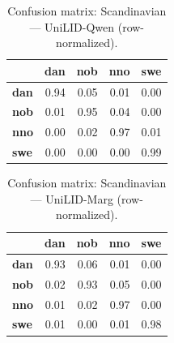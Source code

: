 \begin{table}[htbp]
\centering
\small
\begin{tabular}{lrrrr}
\toprule
 & \textbf{dan} & \textbf{nob} & \textbf{nno} & \textbf{swe} \\
\midrule
\textbf{dan} & \cellcolor{blue!94}\color{white}0.94 & \cellcolor{blue!4}0.05 & \cellcolor{blue!0}0.01 & \cellcolor{blue!0}0.00 \\
\textbf{nob} & \cellcolor{blue!0}0.01 & \cellcolor{blue!95}\color{white}0.95 & \cellcolor{blue!4}0.04 & \cellcolor{blue!0}0.00 \\
\textbf{nno} & \cellcolor{blue!0}0.00 & \cellcolor{blue!1}0.02 & \cellcolor{blue!97}\color{white}0.97 & \cellcolor{blue!0}0.01 \\
\textbf{swe} & \cellcolor{blue!0}0.00 & \cellcolor{blue!0}0.00 & \cellcolor{blue!0}0.00 & \cellcolor{blue!98}\color{white}0.99 \\
\bottomrule
\end{tabular}
\caption{Confusion matrix: Scandinavian — UniLID-Qwen (row-normalized).}
\label{tab:cm-scandinavian-unilid-qwen}
\end{table}

\begin{table}[htbp]
\centering
\small
\begin{tabular}{lrrrr}
\toprule
 & \textbf{dan} & \textbf{nob} & \textbf{nno} & \textbf{swe} \\
\midrule
\textbf{dan} & \cellcolor{blue!92}\color{white}0.93 & \cellcolor{blue!5}0.06 & \cellcolor{blue!1}0.01 & \cellcolor{blue!0}0.00 \\
\textbf{nob} & \cellcolor{blue!1}0.02 & \cellcolor{blue!93}\color{white}0.93 & \cellcolor{blue!5}0.05 & \cellcolor{blue!0}0.00 \\
\textbf{nno} & \cellcolor{blue!0}0.01 & \cellcolor{blue!1}0.02 & \cellcolor{blue!97}\color{white}0.97 & \cellcolor{blue!0}0.00 \\
\textbf{swe} & \cellcolor{blue!0}0.01 & \cellcolor{blue!0}0.00 & \cellcolor{blue!0}0.01 & \cellcolor{blue!98}\color{white}0.98 \\
\bottomrule
\end{tabular}
\caption{Confusion matrix: Scandinavian — UniLID-Marg (row-normalized).}
\label{tab:cm-scandinavian-unilid-marg}
\end{table}

